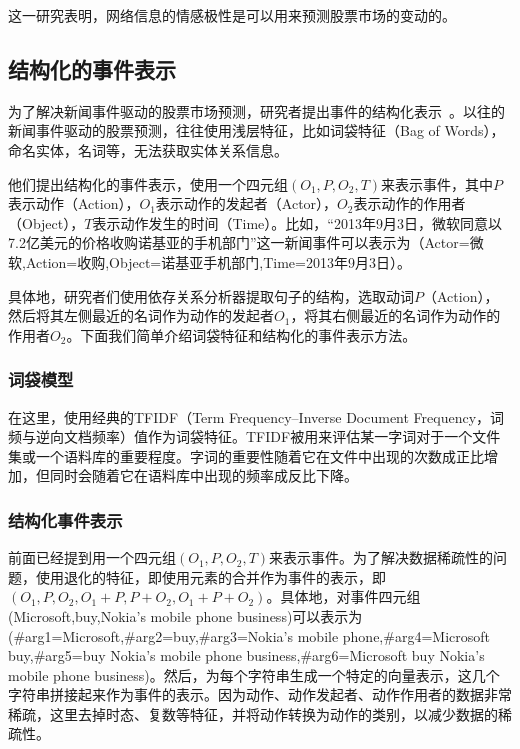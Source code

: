 这一研究表明，网络信息的情感极性是可以用来预测股票市场的变动的。

\subsection{结构化的事件表示}

为了解决新闻事件驱动的股票市场预测，研究者提出事件的结构化表示~\cite{ding2014using}。以往的新闻事件驱动的股票预测，往往使用浅层特征，比如词袋特征（Bag of Words），命名实体，名词等，无法获取实体关系信息。

他们提出结构化的事件表示，使用一个四元组$(O_1,P,O_2,T)$来表示事件，其中$P$表示动作（Action），$O_1$表示动作的发起者（Actor），$O_2$表示动作的作用者（Object），$T$表示动作发生的时间（Time）。比如，“2013年9月3日，微软同意以7.2亿美元的价格收购诺基亚的手机部门”这一新闻事件可以表示为（Actor=微软,Action=收购,Object=诺基亚手机部门,Time=2013年9月3日）。

具体地，研究者们使用依存关系分析器提取句子的结构，选取动词$P$（Action），然后将其左侧最近的名词作为动作的发起者$O_1$，将其右侧最近的名词作为动作的作用者$O_2$。下面我们简单介绍词袋特征和结构化的事件表示方法。

\subsubsection{词袋模型}

在这里，使用经典的TFIDF（Term Frequency–Inverse Document Frequency，词频与逆向文档频率）值作为词袋特征。TFIDF被用来评估某一字词对于一个文件集或一个语料库的重要程度。字词的重要性随着它在文件中出现的次数成正比增加，但同时会随着它在语料库中出现的频率成反比下降。

\subsubsection{结构化事件表示}

前面已经提到用一个四元组$(O_1,P,O_2,T)$来表示事件。为了解决数据稀疏性的问题，使用退化的特征，即使用元素的合并作为事件的表示，即$(O_1,P,O_2,O_1+P,P+O_2,O_1+P+O_2)$。具体地，对事件四元组(Microsoft,buy,Nokia's mobile phone business)可以表示为(\#arg1=Microsoft,\#arg2=buy,\#arg3=Nokia's mobile phone,\#arg4=Microsoft buy,\#arg5=buy Nokia's mobile phone business,\#arg6=Microsoft buy Nokia's mobile phone business)。然后，为每个字符串生成一个特定的向量表示，这几个字符串拼接起来作为事件的表示。因为动作、动作发起者、动作作用者的数据非常稀疏，这里去掉时态、复数等特征，并将动作转换为动作的类别，以减少数据的稀疏性。

